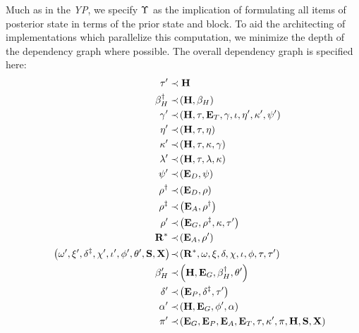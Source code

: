 Much as in the \emph{YP}, we specify $\Upsilon$ as the implication of formulating all items of posterior state in terms of the prior state and block. To aid the architecting of implementations which parallelize this computation, we minimize the depth of the dependency graph where possible. The overall dependency graph is specified here:
\begin{align}\label{eq:transitionfunctioncomposition}
  \thetime' &\prec \theheader \\
  \recenthistorypostparentstaterootupdate &\prec \tup{\theheader, \recenthistory} \label{eq:betadagger} \\
  \safrole' &\prec \tup{\theheader, \thetime, \xttickets, \safrole, \stagingset, \entropy', \activeset', \disputes'} \\
  \entropy' &\prec \tup{\theheader, \thetime, \entropy} \\
  \activeset' &\prec \tup{\theheader, \thetime, \activeset, \safrole} \\
  \previousset' &\prec \tup{\theheader, \thetime, \previousset, \activeset} \\
  \disputes' &\prec \tup{\xtdisputes, \disputes} \\
  \reportspostjudgement &\prec \tup{\xtdisputes, \reports} \label{eq:rhodagger} \\
  \reportspostguarantees &\prec \tup{\xtassurances, \reportspostjudgement} \label{eq:rhoddagger} \\
  \reports' &\prec \tup{\xtguarantees, \reportspostguarantees, \activeset, \thetime'} \label{eq:rhoprime} \\
  \justbecameavailable^* &\prec \tup{\xtassurances, \reports'} \\
  \tup{\ready', \accumulated', \accountspostxfer, \privileges', \stagingset', \authqueue', \lastaccout', \accumulationstatistics, \deferredtransfersstatistics} &\prec \tup{\justbecameavailable^*, \ready, \accumulated, \accountspre, \privileges, \stagingset, \authqueue, \thetime, \thetime'} \label{eq:accountspostxfer} \\
  \recenthistory' &\prec \tup{\theheader, \xtguarantees, \recenthistorypostparentstaterootupdate, \lastaccout'} \label{eq:betaprime} \\
  \accountspostpreimage &\prec \tup{\xtpreimages, \accountspostxfer, \thetime'} \label{eq:accountspostpreimage} \\
  \authpool' &\prec \tup{\theheader, \xtguarantees, \authqueue', \authpool} \\
  \activity' &\prec \tup{\xtguarantees, \xtpreimages, \xtassurances, \xttickets, \thetime, \activeset', \activity, \theheader, \accumulationstatistics, \deferredtransfersstatistics}\!\!\!\!\!\!\!\!
\end{align}


